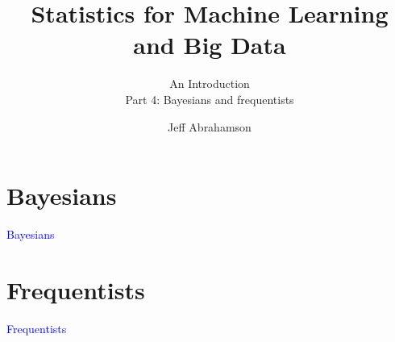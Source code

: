 \documentclass[t]{beamer}
\title
{Statistics for Machine Learning and Big Data}
\subtitle{An Introduction\\[6mm] Part 4: Bayesians and frequentists}
\author[Abrahamson] {Jeff Abrahamson}
\newcommand\blue[1]{\textcolor{blue}{#1}}
\newcommand\talksection[1]{\section{#1}
\begin{frame}
  \vfill\Huge\bf\blue{\centerline{#1}}
\end{frame}
}
\begin{document}
\begin{frame}
  \titlepage
\end{frame}

\talksection{Bayesians}

\begin{frame}
  \frametitle{}

  \note{

  }
\end{frame}

\begin{frame}
  \frametitle{}

  \note{

  }
\end{frame}

\begin{frame}
  \frametitle{}

  \note{

  }
\end{frame}

\begin{frame}
  \frametitle{}

  \note{

  }
\end{frame}

\begin{frame}
  \frametitle{}

  \note{

  }
\end{frame}

\begin{frame}
  \frametitle{}

  \note{

  }
\end{frame}

\begin{frame}
  \frametitle{}

  \note{

  }
\end{frame}

\talksection{Frequentists}

\begin{frame}
  \frametitle{}

  \note{

  }
\end{frame}

\begin{frame}
  \frametitle{}

  \note{

  }
\end{frame}
\end{document}
